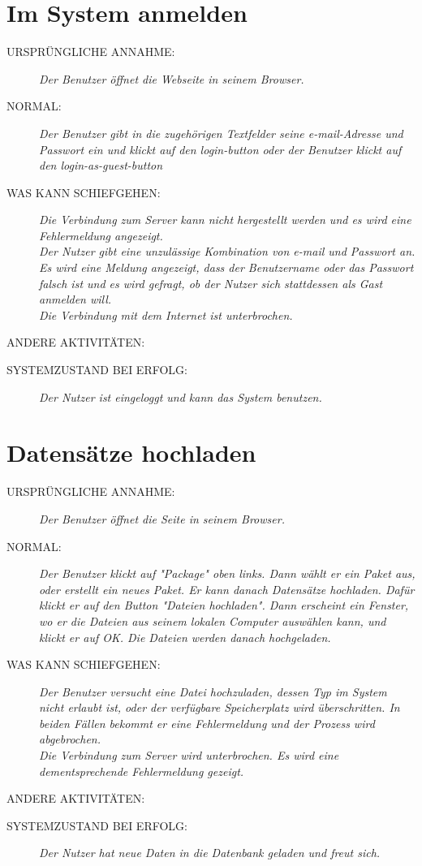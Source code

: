 

\section{Im System anmelden}
\begin{description}
  \item [URSPRÜNGLICHE ANNAHME:]
    \textit{Der Benutzer öffnet die Webseite in seinem Browser.}
  \item [NORMAL:]
    \textit{Der Benutzer gibt in die zugehörigen Textfelder seine e-mail-Adresse und Passwort ein und klickt auf den login-button oder der Benutzer klickt auf den login-as-guest-button}
  \item [WAS KANN SCHIEFGEHEN:]
    \textit{Die Verbindung zum Server kann nicht hergestellt werden und es wird eine Fehlermeldung angezeigt.\\ 
Der Nutzer gibt eine unzulässige Kombination von e-mail und Passwort an. Es wird eine Meldung angezeigt, dass der Benutzername oder das Passwort falsch ist und es wird gefragt, ob der Nutzer sich stattdessen als Gast anmelden will.\\
Die Verbindung mit dem Internet ist unterbrochen.
}
  \item [ANDERE AKTIVITÄTEN:]
    \textit{}
  \item [SYSTEMZUSTAND BEI ERFOLG:]
    \textit{Der Nutzer ist eingeloggt und kann das System benutzen.}
\end{description}


\section{Datensätze hochladen}
\begin{description}
  \item [URSPRÜNGLICHE ANNAHME:]
    \textit{Der Benutzer öffnet die Seite in seinem Browser.}
  \item [NORMAL:]
    \textit{Der Benutzer klickt auf "Package" oben links. Dann wählt er ein Paket aus, oder erstellt ein neues Paket. Er kann danach Datensätze hochladen. Dafür klickt er auf den Button "Dateien hochladen". Dann erscheint ein Fenster, wo er die Dateien aus seinem lokalen Computer auswählen kann, und klickt er auf OK. Die Dateien werden danach hochgeladen.}
  \item [WAS KANN SCHIEFGEHEN:]
    \textit{Der Benutzer versucht eine Datei hochzuladen, dessen Typ im System nicht erlaubt ist, oder der verfügbare Speicherplatz wird überschritten. In beiden Fällen bekommt er eine Fehlermeldung und der Prozess wird abgebrochen.\\
    Die Verbindung zum Server wird unterbrochen. Es wird eine dementsprechende Fehlermeldung gezeigt.
}
  \item [ANDERE AKTIVITÄTEN:]
    \textit{}
  \item [SYSTEMZUSTAND BEI ERFOLG:]
    \textit{Der Nutzer hat neue Daten in die Datenbank geladen und freut sich.}
\end{description}



